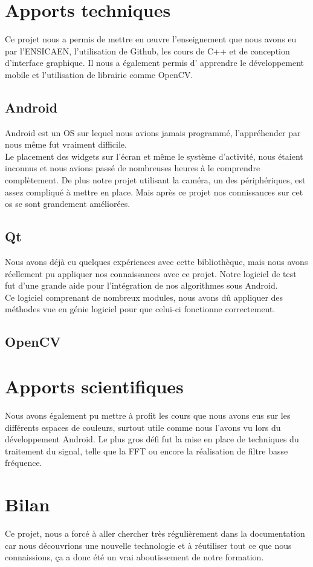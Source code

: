 \section{Apports techniques}

Ce projet nous a permis de mettre en œuvre l'enseignement que nous avons eu par l'ENSICAEN, l'utilisation de Github, les cours de C++ et de conception d'interface graphique. Il nous a également permis d'
apprendre le développement mobile et l'utilisation de librairie comme OpenCV\@.

\subsection{Android}
	Android est un OS sur lequel nous avions jamais programmé, l'appréhender par nous même fut vraiment difficile.\\
	Le placement des widgets sur l'écran et même le système d'activité, nous étaient inconnus et nous avions passé de nombreuses heures à le comprendre complètement.
	De plus notre projet utilisant la caméra, un des périphériques, est assez compliqué à mettre en place.
	Mais après ce projet nos connissances sur cet os se sont grandement améliorées.

\subsection{Qt}
	Nous avons déjà eu quelques expériences avec cette bibliothèque, mais nous avons réellement pu appliquer nos connaissances avec ce projet.
	Notre logiciel de test fut d'une grande aide pour l'intégration de nos algorithmes sous Android.\\
	Ce logiciel comprenant de nombreux modules, nous avons dû appliquer des méthodes vue en génie logiciel pour que celui-ci fonctionne correctement.

\subsection{OpenCV}

\section{Apports scientifiques}

Nous avons également pu mettre à profit les cours que nous avons eus sur les différents espaces de couleurs, surtout utile comme nous l'avons vu lors du développement Android. Le plus gros défi fut la mise
en place de techniques du traitement du signal, telle que la FFT ou encore la réalisation de filtre basse fréquence. 

\section{Bilan}

Ce projet, nous a forcé à aller chercher très régulièrement dans la documentation car nous découvrions une nouvelle technologie et à réutiliser tout ce que nous connaissions, ça a donc été un vrai 
aboutissement de notre formation.
